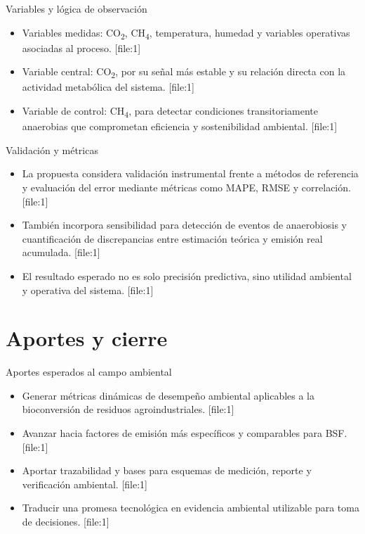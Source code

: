 \documentclass[10pt,aspectratio=169]{beamer}
\newcommand{\basecite}{\hfill{\color{griscita}\tiny [file:1]}}
\begin{document}
\begin{frame}{Variables y lógica de observación}
\justifying
\begin{itemize}
    \item Variables medidas: CO\textsubscript{2}, CH\textsubscript{4}, temperatura, humedad y variables operativas asociadas al proceso. \basecite
    \item Variable central: CO\textsubscript{2}, por su señal más estable y su relación directa con la actividad metabólica del sistema. \basecite
    \item Variable de control: CH\textsubscript{4}, para detectar condiciones transitoriamente anaerobias que comprometan eficiencia y sostenibilidad ambiental. \basecite
\end{itemize}
\end{frame}

\begin{frame}{Validación y métricas}
\justifying
\begin{itemize}
    \item La propuesta considera validación instrumental frente a métodos de referencia y evaluación del error mediante métricas como MAPE, RMSE y correlación. \basecite
    \item También incorpora sensibilidad para detección de eventos de anaerobiosis y cuantificación de discrepancias entre estimación teórica y emisión real acumulada. \basecite
    \item El resultado esperado no es solo precisión predictiva, sino utilidad ambiental y operativa del sistema. \basecite
\end{itemize}
\end{frame}

\section{Aportes y cierre}

\begin{frame}{Aportes esperados al campo ambiental}
\justifying
\begin{itemize}
    \item Generar métricas dinámicas de desempeño ambiental aplicables a la bioconversión de residuos agroindustriales. \basecite
    \item Avanzar hacia factores de emisión más específicos y comparables para BSF. \basecite
    \item Aportar trazabilidad y bases para esquemas de medición, reporte y verificación ambiental. \basecite
    \item Traducir una promesa tecnológica en evidencia ambiental utilizable para toma de decisiones. \basecite
\end{itemize}
\end{frame}
\end{document}

